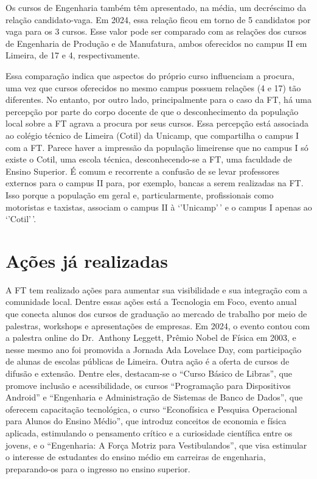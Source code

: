 \documentclass[
  letterpaper,
  DIV=11,
  numbers=noendperiod]{scrreprt}
\begin{document}
Os cursos de Engenharia também têm apresentado, na média, um decréscimo
da relação candidato-vaga. Em 2024, essa relação ficou em torno de 5
candidatos por vaga para os 3 cursos. Esse valor pode ser comparado com
as relações dos cursos de Engenharia de Produção e de Manufatura, ambos
oferecidos no campus II em Limeira, de 17 e 4, respectivamente.

Essa comparação indica que aspectos do próprio curso influenciam a
procura, uma vez que cursos oferecidos no mesmo campus possuem relações
(4 e 17) tão diferentes. No entanto, por outro lado, principalmente para
o caso da FT, há uma percepção por parte do corpo docente de que o
desconhecimento da população local sobre a FT agrava a procura por seus
cursos. Essa percepção está associada ao colégio técnico de Limeira
(Cotil) da Unicamp, que compartilha o campus I com a FT. Parece haver a
impressão da população limeirense que no campus I só existe o Cotil, uma
escola técnica, desconhecendo-se a FT, uma faculdade de Ensino Superior.
É comum e recorrente a confusão de se levar professores externos para o
campus II para, por exemplo, bancas a serem realizadas na FT. Isso
porque a população em geral e, particularmente, profissionais como
motoristas e taxistas, associam o campus II à `'Unicamp'\,' e o campus I
apenas ao `'Cotil'\,'.

\section{Ações já realizadas}\label{auxe7uxf5es-juxe1-realizadas}

A FT tem realizado ações para aumentar sua visibilidade e sua integração
com a comunidade local. Dentre essas ações está a Tecnologia em Foco,
evento anual que conecta alunos dos cursos de graduação ao mercado de
trabalho por meio de palestras, workshops e apresentações de empresas.
Em 2024, o evento contou com a palestra online do Dr.~Anthony Leggett,
Prêmio Nobel de Física em 2003, e nesse mesmo ano foi promovida a
Jornada Ada Lovelace Day, com participação de alunas de escolas públicas
de Limeira. Outra ação é a oferta de cursos de difusão e extensão.
Dentre eles, destacam-se o ``Curso Básico de Libras'', que promove
inclusão e acessibilidade, os cursos ``Programação para Dispositivos
Android'' e ``Engenharia e Administração de Sistemas de Banco de
Dados'', que oferecem capacitação tecnológica, o curso ``Econofísica e
Pesquisa Operacional para Alunos do Ensino Médio'', que introduz
conceitos de economia e física aplicada, estimulando o pensamento
crítico e a curiosidade científica entre os jovens, e o ``Engenharia: A
Força Motriz para Vestibulandos'', que visa estimular o interesse de
estudantes do ensino médio em carreiras de engenharia, preparando-os
para o ingresso no ensino superior.
\end{document}

